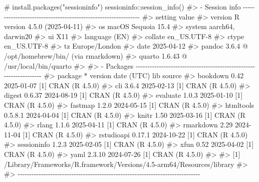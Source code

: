 \documentclass[
  10pt,
  a4paper,
]{book}
\newenvironment{Shaded}{\begin{snugshade}}{\end{snugshade}}
\newcommand{\CommentTok}[1]{\textcolor[rgb]{0.37,0.37,0.37}{#1}}
\newcommand{\FunctionTok}[1]{\textcolor[rgb]{0.28,0.35,0.67}{#1}}
\newcommand{\NormalTok}[1]{\textcolor[rgb]{0.00,0.46,0.62}{#1}}
\newcommand{\SpecialCharTok}[1]{\textcolor[rgb]{0.37,0.37,0.37}{#1}}
\begin{document}
\begin{Shaded}
\begin{Highlighting}[]
\CommentTok{\# install.packages("sessioninfo")}
\NormalTok{sessioninfo}\SpecialCharTok{::}\FunctionTok{session\_info}\NormalTok{()}
\CommentTok{\#\textgreater{} {-} Session info {-}{-}{-}{-}{-}{-}{-}{-}{-}{-}{-}{-}{-}{-}{-}{-}{-}{-}{-}{-}{-}{-}{-}{-}{-}{-}{-}{-}{-}{-}{-}{-}{-}{-}{-}{-}{-}{-}{-}{-}{-}{-}{-}{-}{-}{-}{-}{-}{-}{-}{-}{-}{-}{-}{-}{-}{-}{-}{-}{-}{-}{-}{-}}
\CommentTok{\#\textgreater{}  setting  value}
\CommentTok{\#\textgreater{}  version  R version 4.5.0 (2025{-}04{-}11)}
\CommentTok{\#\textgreater{}  os       macOS Sequoia 15.4}
\CommentTok{\#\textgreater{}  system   aarch64, darwin20}
\CommentTok{\#\textgreater{}  ui       X11}
\CommentTok{\#\textgreater{}  language (EN)}
\CommentTok{\#\textgreater{}  collate  en\_US.UTF{-}8}
\CommentTok{\#\textgreater{}  ctype    en\_US.UTF{-}8}
\CommentTok{\#\textgreater{}  tz       Europe/London}
\CommentTok{\#\textgreater{}  date     2025{-}04{-}12}
\CommentTok{\#\textgreater{}  pandoc   3.6.4 @ /opt/homebrew/bin/ (via rmarkdown)}
\CommentTok{\#\textgreater{}  quarto   1.6.43 @ /usr/local/bin/quarto}
\CommentTok{\#\textgreater{} }
\CommentTok{\#\textgreater{} {-} Packages {-}{-}{-}{-}{-}{-}{-}{-}{-}{-}{-}{-}{-}{-}{-}{-}{-}{-}{-}{-}{-}{-}{-}{-}{-}{-}{-}{-}{-}{-}{-}{-}{-}{-}{-}{-}{-}{-}{-}{-}{-}{-}{-}{-}{-}{-}{-}{-}{-}{-}{-}{-}{-}{-}{-}{-}{-}{-}{-}{-}{-}{-}{-}{-}{-}{-}{-}}
\CommentTok{\#\textgreater{}  package     * version date (UTC) lib source}
\CommentTok{\#\textgreater{}  bookdown      0.42    2025{-}01{-}07 [1] CRAN (R 4.5.0)}
\CommentTok{\#\textgreater{}  cli           3.6.4   2025{-}02{-}13 [1] CRAN (R 4.5.0)}
\CommentTok{\#\textgreater{}  digest        0.6.37  2024{-}08{-}19 [1] CRAN (R 4.5.0)}
\CommentTok{\#\textgreater{}  evaluate      1.0.3   2025{-}01{-}10 [1] CRAN (R 4.5.0)}
\CommentTok{\#\textgreater{}  fastmap       1.2.0   2024{-}05{-}15 [1] CRAN (R 4.5.0)}
\CommentTok{\#\textgreater{}  htmltools     0.5.8.1 2024{-}04{-}04 [1] CRAN (R 4.5.0)}
\CommentTok{\#\textgreater{}  knitr         1.50    2025{-}03{-}16 [1] CRAN (R 4.5.0)}
\CommentTok{\#\textgreater{}  rlang         1.1.6   2025{-}04{-}11 [1] CRAN (R 4.5.0)}
\CommentTok{\#\textgreater{}  rmarkdown     2.29    2024{-}11{-}04 [1] CRAN (R 4.5.0)}
\CommentTok{\#\textgreater{}  rstudioapi    0.17.1  2024{-}10{-}22 [1] CRAN (R 4.5.0)}
\CommentTok{\#\textgreater{}  sessioninfo   1.2.3   2025{-}02{-}05 [1] CRAN (R 4.5.0)}
\CommentTok{\#\textgreater{}  xfun          0.52    2025{-}04{-}02 [1] CRAN (R 4.5.0)}
\CommentTok{\#\textgreater{}  yaml          2.3.10  2024{-}07{-}26 [1] CRAN (R 4.5.0)}
\CommentTok{\#\textgreater{} }
\CommentTok{\#\textgreater{}  [1] /Library/Frameworks/R.framework/Versions/4.5{-}arm64/Resources/library}
\CommentTok{\#\textgreater{} }
\CommentTok{\#\textgreater{} {-}{-}{-}{-}{-}{-}{-}{-}{-}{-}{-}{-}{-}{-}{-}{-}{-}{-}{-}{-}{-}{-}{-}{-}{-}{-}{-}{-}{-}{-}{-}{-}{-}{-}{-}{-}{-}{-}{-}{-}{-}{-}{-}{-}{-}{-}{-}{-}{-}{-}{-}{-}{-}{-}{-}{-}{-}{-}{-}{-}{-}{-}{-}{-}{-}{-}{-}{-}{-}{-}{-}{-}{-}{-}{-}{-}{-}{-}}
\end{Highlighting}
\end{Shaded}
\end{document}
